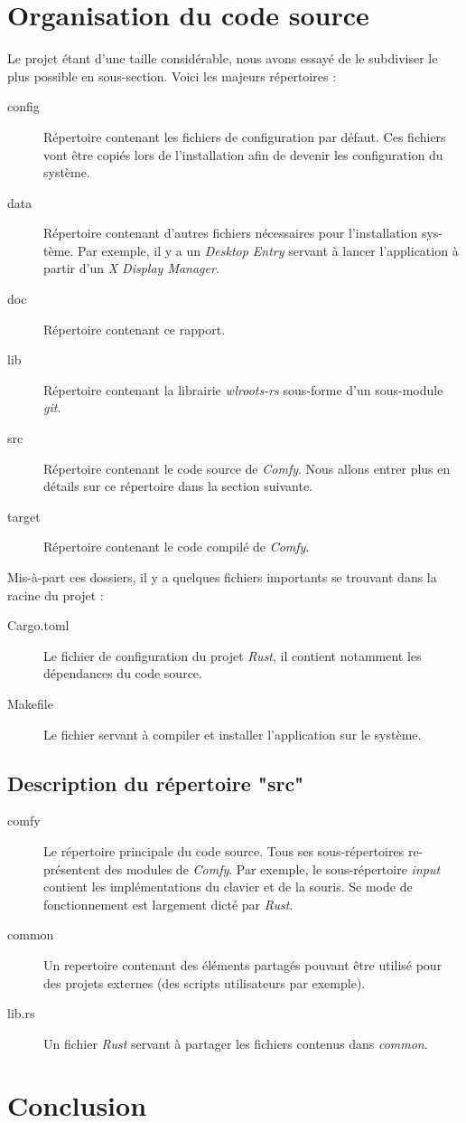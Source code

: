 \documentclass[titlepage]{article}
\begin{document}
\section{Organisation du code source}
Le projet étant d'une taille considérable, nous avons essayé de le subdiviser le plus possible en sous-section. Voici les majeurs répertoires :
\begin{description}
	\item [config] Répertoire contenant les fichiers de configuration par défaut. Ces fichiers vont être copiés lors de l'installation afin de devenir les configuration du système.
	\item [data] Répertoire contenant d'autres fichiers nécessaires pour l'installation sys-tème. Par exemple, il y a un \textit{Desktop Entry} servant à lancer l'application à partir d'un \textit{X Display Manager}.
	\item [doc] Répertoire contenant ce rapport.
	\item [lib] Répertoire contenant la librairie \textit{wlroots-rs} sous-forme d'un sous-module \textit{git}.
	\item [src] Répertoire contenant le code source de \textit{Comfy}. Nous allons entrer plus en détails sur ce répertoire dans la section suivante.
	\item [target] Répertoire contenant le code compilé de \textit{Comfy}.
\end{description}

Mis-à-part ces dossiers, il y a quelques fichiers importants se trouvant dans la racine du projet :
\begin{description}
	\item [Cargo.toml] Le fichier de configuration du projet \textit{Rust}, il contient notamment les dépendances du code source.
	\item [Makefile] Le fichier servant à compiler et installer l'application sur le système.
\end{description}
\subsection{Description du répertoire "src"}
\begin{description}
	\item [comfy] Le répertoire principale du code source. Tous ses sous-répertoires re-présentent des modules de \textit{Comfy}. Par exemple, le sous-répertoire \textit{input} contient les implémentations du clavier et de la souris. Se mode de fonctionnement est largement dicté par \textit{Rust}.
	\item [common] Un repertoire contenant des éléments partagés pouvant être utilisé pour des projets externes (des scripts utilisateurs par exemple).
	\item [lib.rs] Un fichier \textit{Rust} servant à partager les fichiers contenus dans \textit{common}.
\end{description}
\section{Conclusion}
\end{document}
